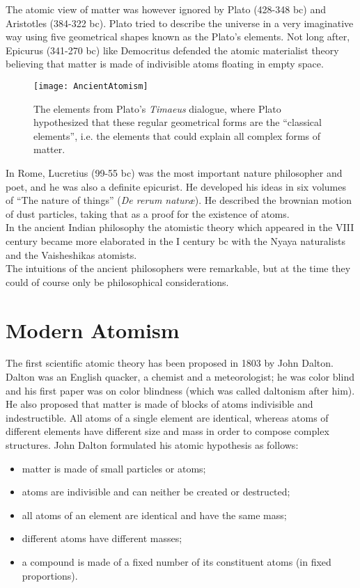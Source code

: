 The atomic view of  matter was however ignored by Plato (428-348
bc) and Aristotles (384-322 bc). Plato tried to describe the
universe in a very imaginative way using five geometrical shapes known
as the Plato's elements. Not long after, Epicurus (341-270 bc) like
Democritus defended the atomic materialist theory believing that
matter is made of indivisible atoms floating in empty space.

\begin{figure}
  \centering
  \texttt{[image: AncientAtomism]}
\caption{The elements from Plato's {\it Timaeus} dialogue, where Plato hypothesized that these regular geometrical forms are the ``classical elements'', i.e. the elements that could explain all complex forms of matter.}  \label{fig:ancientA}
\end{figure}

In Rome, Lucretius (99-55 bc) was the most important nature philosopher and poet, and he was also a definite epicurist. He developed his ideas in six volumes of ``The nature of things'' (\emph{De rerum natur\ae}). He described
the brownian motion of dust particles, taking that as a proof for the existence of atoms. \\

In the ancient Indian philosophy the atomistic theory which appeared
in the VIII century became more elaborated in the I century bc with
the Nyaya naturalists and the Vaisheshikas atomists. \\

The intuitions of the ancient philosophers were remarkable, but at the time they could of course only be philosophical considerations.

\section{Modern Atomism}
\label{Atomism}

The first scientific atomic theory has been proposed in 1803 by John
Dalton. Dalton was an English quacker, a chemist and a meteorologist;
he was color blind and his first paper was on color blindness (which
was called daltonism after him). He also proposed that  matter is made of
blocks of atoms indivisible and indestructible. All atoms of a single
element are identical, whereas atoms of different elements have
different size and mass in order to compose complex structures. 
John Dalton formulated his atomic hypothesis as follows:
\begin{itemize}
    \item matter is made of small particles or atoms;
    \item atoms are indivisible and can neither be created or destructed;
    \item all atoms of an element are identical and have the same mass;
    \item different atoms have different masses;
    \item a compound is made of a fixed number of its constituent atoms (in fixed proportions).
\end{itemize}

